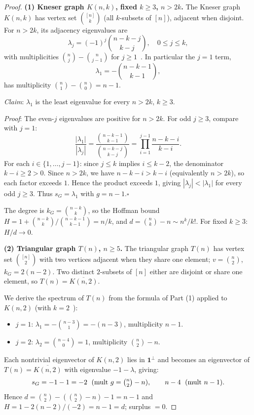 \documentclass{article}
\theoremstyle{definition}
\begin{document}
\begin{proof}
\textbf{(1) Kneser graph $K(n,k)$, fixed $k\ge 3$, $n > 2k$.}
The Kneser graph $K(n,k)$ has vertex set $\binom{[n]}{k}$ (all $k$-subsets of $[n]$), adjacent when disjoint.  For $n > 2k$, its adjacency eigenvalues are
\[
  \lambda_j = (-1)^j\binom{n-k-j}{k-j},\quad 0\le j\le k,
\]
with multiplicities $\binom{n}{j}-\binom{n}{j-1}$ for $j\ge 1$~\cite{BvM2022}.  In particular the $j=1$ term,
\[
  \lambda_1 = -\binom{n-k-1}{k-1},
\]
has multiplicity $\binom{n}{1}-\binom{n}{0} = n-1$.

\textit{Claim}: $\lambda_1$ is the least eigenvalue for every $n > 2k$, $k\ge 3$.

\textit{Proof}: The even-$j$ eigenvalues are positive for $n>2k$.  For odd $j\ge 3$, compare with $j=1$:
\[
  \frac{|\lambda_1|}{|\lambda_j|}
  = \frac{\binom{n-k-1}{k-1}}{\binom{n-k-j}{k-j}}
  = \prod_{i=1}^{j-1}\frac{n-k-i}{k-i}.
\]
For each $i\in\{1,\ldots,j-1\}$: since $j\le k$ implies $i\le k-2$, the denominator $k-i\ge 2 > 0$.  Since $n>2k$, we have $n-k-i > k-i$ (equivalently $n>2k$), so each factor exceeds $1$.  Hence the product exceeds $1$, giving $|\lambda_j| < |\lambda_1|$ for every odd $j\ge 3$.  Thus $s_G = \lambda_1$ with $g = n-1$.\hfill$\square$

The degree is $k_G = \binom{n-k}{k}$, so the Hoffman bound
$H = 1 + \binom{n-k}{k}/\binom{n-k-1}{k-1} = n/k$,
and $d = \binom{n}{k}-n\sim n^k/k!$.  For fixed $k\ge 3$: $H/d \to 0$.

\textbf{(2) Triangular graph $T(n)$, $n\ge 5$.}
The triangular graph $T(n)$ has vertex set $\binom{[n]}{2}$ with two vertices adjacent when they share one element; $v=\binom{n}{2}$, $k_G=2(n-2)$.  Two distinct $2$-subsets of $[n]$ either are disjoint or share one element, so $T(n) = \overline{K(n,2)}$.

We derive the spectrum of $T(n)$ from the formula of Part (1) applied to $K(n,2)$ (with $k=2$~\cite{BvM2022}):
\begin{itemize}
  \item $j=1$: $\lambda_1 = -\binom{n-3}{1} = -(n-3)$, multiplicity $n-1$.
  \item $j=2$: $\lambda_2 = \binom{n-4}{0} = 1$, multiplicity $\binom{n}{2}-n$.
\end{itemize}
Each nontrivial eigenvector of $K(n,2)$ lies in $\mathbf{1}^\perp$ and becomes an eigenvector of $T(n)=\overline{K(n,2)}$ with eigenvalue $-1-\lambda$, giving:
\[
  s_G = -1-1 = -2\;\text{ (mult }g=\tbinom{n}{2}-n\text{)},
  \qquad
  n-4\;\text{ (mult }n-1\text{)}.
\]
Hence $d = \binom{n}{2}-(\binom{n}{2}-n)-1 = n-1$ and $H = 1-2(n-2)/(-2) = n-1 = d$; surplus $= 0$.


\end{proof}
\end{document}
